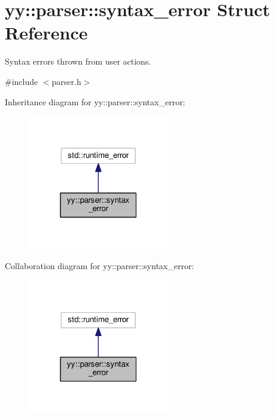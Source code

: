 \hypertarget{structyy_1_1parser_1_1syntax__error}{}\section{yy\+:\+:parser\+:\+:syntax\+\_\+error Struct Reference}
\label{structyy_1_1parser_1_1syntax__error}


Syntax errors thrown from user actions.  




{\ttfamily \#include $<$parser.\+h$>$}



Inheritance diagram for yy\+:\+:parser\+:\+:syntax\+\_\+error\+:\nopagebreak
\begin{figure}[H]
\begin{center}
\leavevmode
\includegraphics[width=175pt]{structyy_1_1parser_1_1syntax__error__inherit__graph}
\end{center}
\end{figure}


Collaboration diagram for yy\+:\+:parser\+:\+:syntax\+\_\+error\+:\nopagebreak
\begin{figure}[H]
\begin{center}
\leavevmode
\includegraphics[width=175pt]{structyy_1_1parser_1_1syntax__error__coll__graph}
\end{center}
\end{figure}
